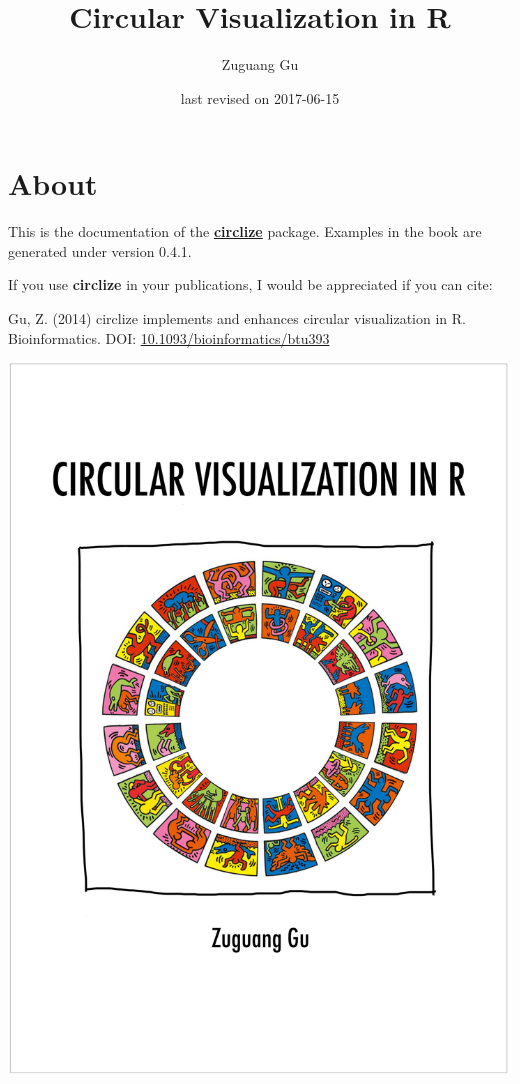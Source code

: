 \documentclass[]{book}
\title{Circular Visualization in R}
\author{Zuguang Gu}
\date{last revised on 2017-06-15}
\theoremstyle{definition}
\theoremstyle{definition}
\theoremstyle{remark}
\begin{document}
\maketitle

{
\setcounter{tocdepth}{1}
\tableofcontents
}
\chapter*{About}\label{about}

This is the documentation of the
\href{https://cran.r-project.org/package=circlize}{\textbf{circlize}}
package. Examples in the book are generated under version 0.4.1.

If you use \textbf{circlize} in your publications, I would be
appreciated if you can cite:

Gu, Z. (2014) circlize implements and enhances circular visualization in
R. Bioinformatics. DOI:
\href{https://doi.org/10.1093/bioinformatics/btu393}{10.1093/bioinformatics/btu393}

\begin{center}\includegraphics[width=34.44in]{images/circlize_cover} \end{center}
\end{document}
